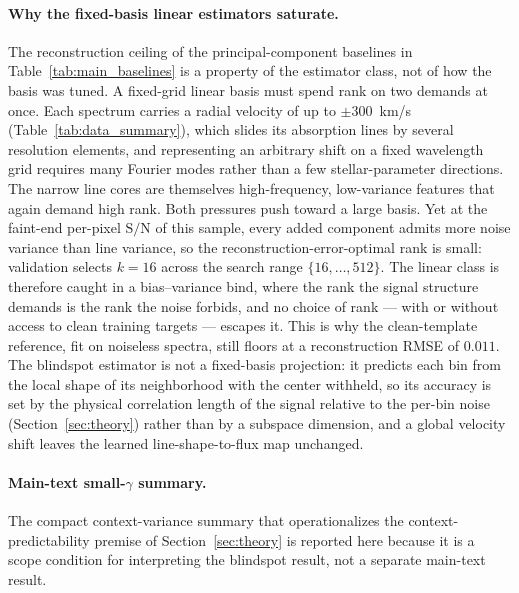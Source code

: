 \documentclass[twocolumn]{aastex7}
\newcommand{\SNR}{\mathrm{S}/\mathrm{N}}
\begin{document}
\paragraph{Why the fixed-basis linear estimators saturate.} The reconstruction ceiling of the principal-component baselines in Table~\ref{tab:main_baselines} is a property of the estimator class, not of how the basis was tuned. A fixed-grid linear basis must spend rank on two demands at once. Each spectrum carries a radial velocity of up to $\pm300$~km/s (Table~\ref{tab:data_summary}), which slides its absorption lines by several resolution elements, and representing an arbitrary shift on a fixed wavelength grid requires many Fourier modes rather than a few stellar-parameter directions. The narrow line cores are themselves high-frequency, low-variance features that again demand high rank. Both pressures push toward a large basis. Yet at the faint-end per-pixel $\SNR$ of this sample, every added component admits more noise variance than line variance, so the reconstruction-error-optimal rank is small: validation selects $k=16$ across the search range $\{16,\dots,512\}$. The linear class is therefore caught in a bias--variance bind, where the rank the signal structure demands is the rank the noise forbids, and no choice of rank --- with or without access to clean training targets --- escapes it. This is why the clean-template reference, fit on noiseless spectra, still floors at a reconstruction RMSE of $0.011$. The blindspot estimator is not a fixed-basis projection: it predicts each bin from the local shape of its neighborhood with the center withheld, so its accuracy is set by the physical correlation length of the signal relative to the per-bin noise (Section~\ref{sec:theory}) rather than by a subspace dimension, and a global velocity shift leaves the learned line-shape-to-flux map unchanged.

\paragraph{Main-text small-$\gamma$ summary.}
\label{app:context_recoverability}
The compact context-variance summary that operationalizes the context-predictability premise of Section~\ref{sec:theory} is reported here because it is a scope condition for interpreting the blindspot result, not a separate main-text result.
\end{document}
